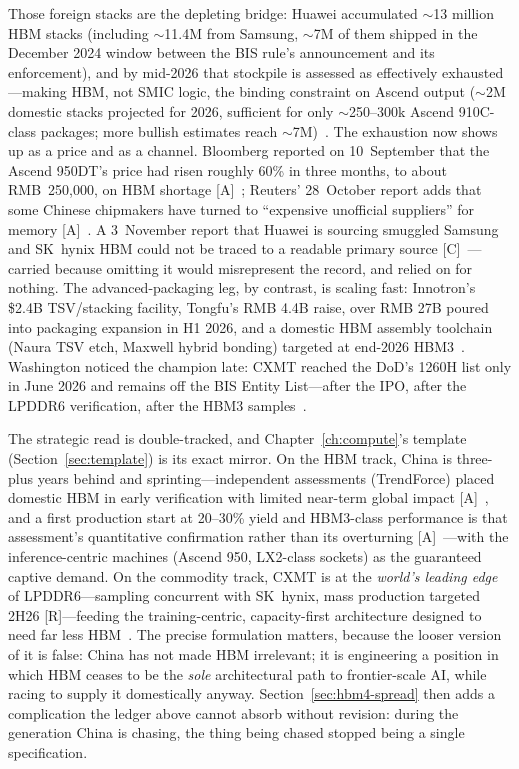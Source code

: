 Those foreign stacks are the depleting bridge: Huawei accumulated $\sim$13 million HBM stacks (including $\sim$11.4M from Samsung, $\sim$7M of them shipped in the December 2024 window between the BIS rule's announcement and its enforcement), and by mid-2026 that stockpile is assessed as effectively exhausted---making HBM, not SMIC logic, the binding constraint on Ascend output ($\sim$2M domestic stacks projected for 2026, sufficient for only $\sim$250--300k Ascend 910C-class packages; more bullish estimates reach $\sim$7M)~\cite{semianalysis-ascend,substrate}. The exhaustion now shows up as a price and as a channel. Bloomberg reported on 10~September that the Ascend 950DT's price had risen roughly 60\% in three months, to about RMB~250{,}000, on HBM shortage [A]~\cite{hw-ascend-price}; Reuters' 28~October report adds that some Chinese chipmakers have turned to ``expensive unofficial suppliers'' for memory [A]~\cite{hw-cxmt-hbm3e}. A 3~November report that Huawei is sourcing smuggled Samsung and SK~hynix HBM could not be traced to a readable primary source [C]~\cite{hw-huawei-hbm-smuggling}---carried because omitting it would misrepresent the record, and relied on for nothing. The advanced-packaging leg, by contrast, is scaling fast: Innotron's \$2.4B TSV/stacking facility, Tongfu's RMB 4.4B raise, over RMB 27B poured into packaging expansion in H1 2026, and a domestic HBM assembly toolchain (Naura TSV etch, Maxwell hybrid bonding) targeted at end-2026 HBM3~\cite{packaging,hbm-toolchain}. Washington noticed the champion late: CXMT reached the DoD's 1260H list only in June 2026 and remains off the BIS Entity List---after the IPO, after the LPDDR6 verification, after the HBM3 samples~\cite{cxmt-ipo}.

The strategic read is double-tracked, and Chapter~\ref{ch:compute}'s template (Section~\ref{sec:template}) is its exact mirror. On the HBM track, China is three-plus years behind and sprinting---independent assessments (TrendForce) placed domestic HBM in early verification with limited near-term global impact [A]~\cite{trendforce-hbm}, and a first production start at 20--30\% yield and HBM3-class performance is that assessment's quantitative confirmation rather than its overturning [A]~\cite{hw-cxmt-hbm3e}---with the inference-centric machines (Ascend 950, LX2-class sockets) as the guaranteed captive demand. On the commodity track, CXMT is at the \emph{world's leading edge} of LPDDR6---sampling concurrent with SK~hynix, mass production targeted 2H26 [R]---feeding the training-centric, capacity-first architecture designed to need far less HBM~\cite{cxmt-lpddr6}. The precise formulation matters, because the looser version of it is false: China has not made HBM irrelevant; it is engineering a position in which HBM ceases to be the \emph{sole} architectural path to frontier-scale AI, while racing to supply it domestically anyway. Section~\ref{sec:hbm4-spread} then adds a complication the ledger above cannot absorb without revision: during the generation China is chasing, the thing being chased stopped being a single specification.

